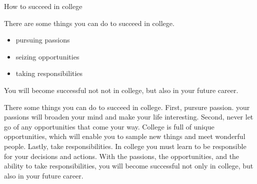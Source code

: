 \documentclass[11pt,a4paper]{article}
\begin{document}
\begin{paracol}{2}
\normalsize
\switchcolumn

\vspace{1em}




How to succeed in college



There are some things you can do to succeed in college.


\begin{itemize}
    \item pursuing passions
    \item seizing opportunities
    \item taking responsibilities
\end{itemize}



You will become successful not not in college, but also in your future career.



There some things you can do to succeed in college. 
First, pursure passion.
your passions will broaden your mind and make your life interesting.
Second, never let go of any opportunities that come your way.
College is full of unique opportunities, 
which will enable you to sample new things and meet wonderful people.
Lastly, take responsibilities.
In college you must learn to be responsible for your decisions and actions.
With the passions, the opportunities, and the ability to take responsibilities,
you will become successful not only in college, 
but also in your future career.













\end{paracol}
\end{document}
